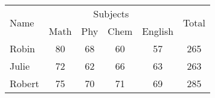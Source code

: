 \documentclass[a4paper]{article}
\begin{document}
\begin{tabular}{|l|*{5}{c|}}
    \hline \multirow{2}{*}{Name} & \multicolumn{4}{c|}{Subjects} &
    \multirow{2}{*}{Total}                                                                    \\
    \cline{2-5}                  & Math                          & Phy & Chem & English &     \\
    \hline
    \hline Robin                 & 80                            & 68  & 60   & 57      & 265 \\
    \hline Julie                 & 72                            & 62  & 66   & 63      & 263 \\
    \hline Robert                & 75                            & 70  & 71   & 69      & 285 \\
    \hline
\end{tabular}
\end{document}

